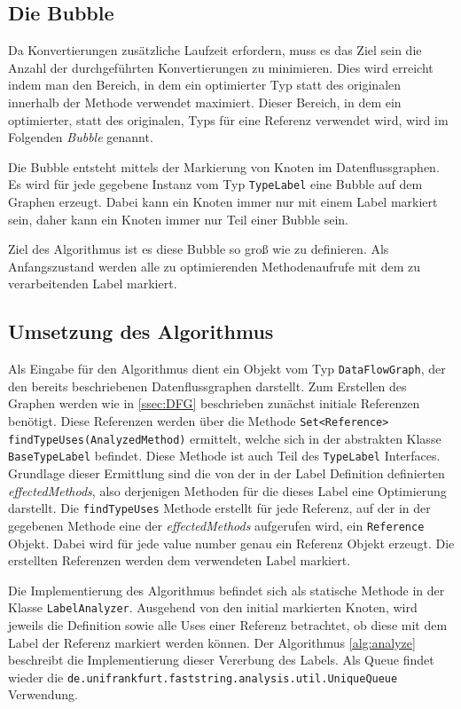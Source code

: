 \subsection{Die Bubble}

Da Konvertierungen zusätzliche Laufzeit erfordern, muss es das Ziel sein die Anzahl 
der durchgeführten Konvertierungen zu minimieren. Dies wird erreicht indem man den
Bereich, in dem ein optimierter Typ statt des originalen innerhalb der Methode 
verwendet maximiert. Dieser Bereich, in dem ein optimierter, statt des originalen, 
Typs für eine Referenz verwendet wird, wird im Folgenden \textit{Bubble} genannt. 

Die Bubble entsteht mittels der Markierung von Knoten im Datenflussgraphen. Es wird 
für jede gegebene Instanz vom Typ \texttt{TypeLabel} eine Bubble auf dem Graphen 
erzeugt. Dabei kann ein Knoten immer nur mit einem Label markiert sein, daher kann
ein Knoten immer nur Teil einer Bubble sein.

Ziel des Algorithmus ist es diese Bubble so groß wie zu definieren. Als Anfangszustand 
werden alle zu optimierenden Methodenaufrufe mit dem zu verarbeitenden Label markiert.

\subsection{Umsetzung des Algorithmus}\label{ssec:umAlg}

Als Eingabe für den Algorithmus dient ein Objekt vom Typ \texttt{DataFlowGraph}, der 
den bereits beschriebenen Datenflussgraphen darstellt. Zum Erstellen des Graphen werden
wie in \ref{ssec:DFG} beschrieben zunächst initiale Referenzen benötigt. Diese Referenzen
werden über die Methode \texttt{Set<Reference>} \\ \texttt{findTypeUses(AnalyzedMethod)} ermittelt, 
welche sich in der abstrakten Klasse \texttt{BaseTypeLabel} befindet. Diese Methode ist auch Teil des 
\texttt{TypeLabel} Interfaces. Grundlage dieser Ermittlung sind die von der in der Label 
Definition definierten \textit{effectedMethods}, also derjenigen Methoden für die dieses 
Label eine Optimierung darstellt. Die \texttt{findTypeUses} Methode erstellt für jede 
Referenz, auf der in der gegebenen Methode eine der \textit{effectedMethods} aufgerufen 
wird, ein \texttt{Reference} Objekt. Dabei wird für jede value number genau ein Referenz 
Objekt erzeugt. Die erstellten Referenzen werden dem verwendeten Label markiert.

Die Implementierung des Algorithmus befindet sich als statische Methode in der Klasse 
\texttt{LabelAnalyzer}. Ausgehend von den initial markierten Knoten, wird jeweils die 
Definition sowie alle Uses einer Referenz betrachtet, ob diese mit dem Label der Referenz 
markiert werden können. Der Algorithmus \ref{alg:analyze} beschreibt die Implementierung 
dieser Vererbung des Labels. Als Queue findet wieder die 
\texttt{de.unifrankfurt.faststring.analysis.util.UniqueQueue} Verwendung.

